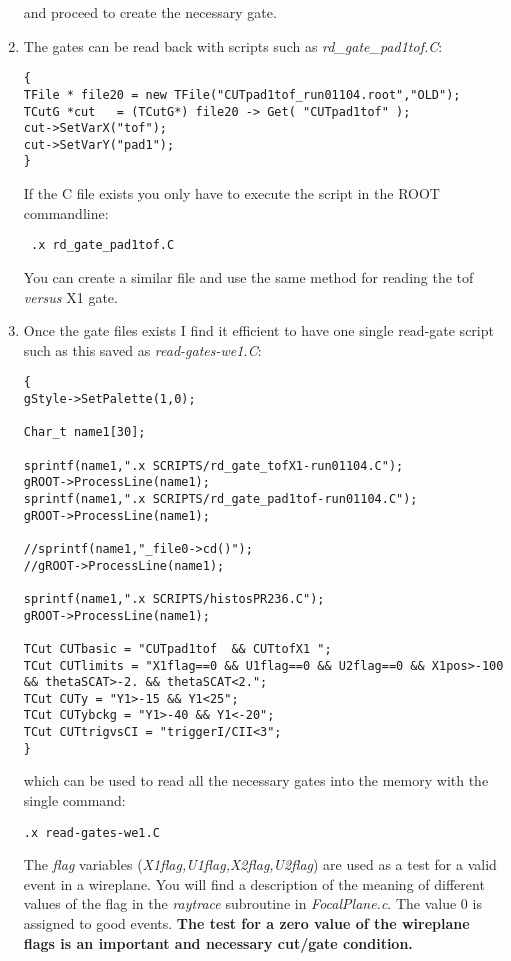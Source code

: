 \documentclass[11pt]{report}
\begin{document}
\begin{enumerate}
and proceed to create the necessary gate.


\item The gates can be read back with scripts such as {\it rd\_gate\_pad1tof.C}:
\begin{verbatim}
{
TFile * file20 = new TFile("CUTpad1tof_run01104.root","OLD");
TCutG *cut   = (TCutG*) file20 -> Get( "CUTpad1tof" );
cut->SetVarX("tof");
cut->SetVarY("pad1");
}
\end{verbatim}
If the C file exists you only have to execute the script in the ROOT commandline:
\begin{verbatim} .x rd_gate_pad1tof.C  \end{verbatim}
You can create a similar file and use the same method for reading the tof {\it versus} X1 gate.


\item Once the gate files exists I find it efficient to have one single read-gate
script such as this saved as {\it read-gates-we1.C}:
\begin{verbatim}
{
gStyle->SetPalette(1,0);

Char_t name1[30];
     
sprintf(name1,".x SCRIPTS/rd_gate_tofX1-run01104.C");
gROOT->ProcessLine(name1);
sprintf(name1,".x SCRIPTS/rd_gate_pad1tof-run01104.C");
gROOT->ProcessLine(name1);

//sprintf(name1,"_file0->cd()");
//gROOT->ProcessLine(name1);

sprintf(name1,".x SCRIPTS/histosPR236.C");
gROOT->ProcessLine(name1);

TCut CUTbasic = "CUTpad1tof  && CUTtofX1 ";
TCut CUTlimits = "X1flag==0 && U1flag==0 && U2flag==0 && X1pos>-100 && thetaSCAT>-2. && thetaSCAT<2.";
TCut CUTy = "Y1>-15 && Y1<25";      
TCut CUTybckg = "Y1>-40 && Y1<-20";      
TCut CUTtrigvsCI = "triggerI/CII<3";
}
\end{verbatim}

which can be used to read all the necessary gates into the memory with the single command:

\begin{verbatim}
.x read-gates-we1.C
\end{verbatim}

The {\it flag} variables ({\it X1flag,U1flag,X2flag,U2flag}) are used as a test for a valid event in a wireplane.
You will find a description of the meaning of different values of the flag in the {\it raytrace} subroutine 
in {\it FocalPlane.c}. The value 0 is assigned to good events.
{\bf The test for a zero value of the wireplane flags is an important and necessary cut/gate condition.}



\end{enumerate}
\end{document}
